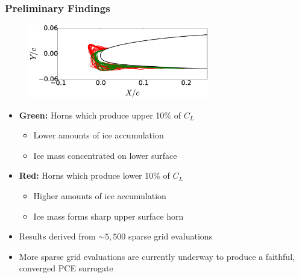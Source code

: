 \documentclass[9pt]{beamer}
\begin{document}
\begin{frame}
\frametitle{Preliminary Findings}
\label{sec-4-4}


\begin{figure}
  \centering
  \includegraphics[width=0.7\textwidth]{GoodBadHornExamps}
\end{figure}

\begin{itemize}
\item \textbf{Green:} Horns which produce upper 10$\%$ of $C_L$
\begin{itemize}
\item Lower amounts of ice accumulation
\item Ice mass concentrated on lower surface
\end{itemize}
\item \textbf{Red:} Horns which produce lower 10$\%$ of $C_L$
\begin{itemize}
\item Higher amounts of ice accumulation
\item Ice mass forms sharp upper surface horn
\end{itemize}
\item Results derived from $\sim 5,500$ sparse grid evaluations
\item More sparse grid evaluations are currently underway to produce a
  faithful, converged PCE surrogate
\end{itemize}
\end{frame}
\end{document}
